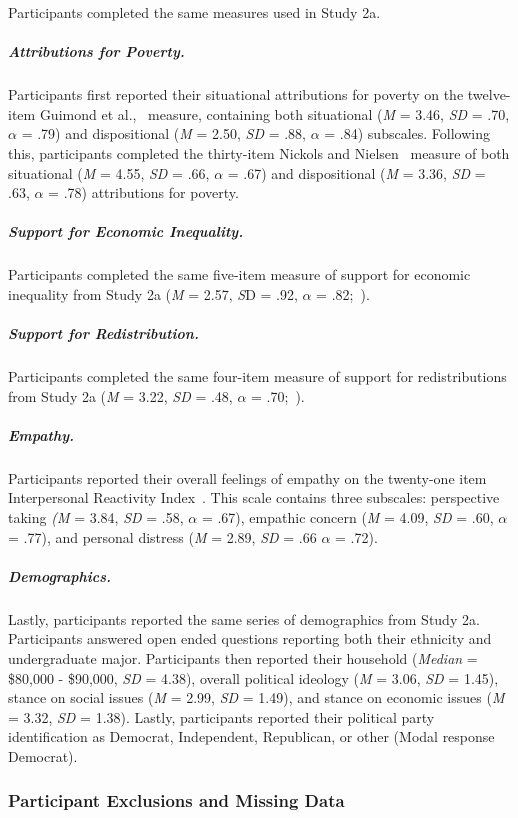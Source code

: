 \documentclass{sfuthesis}
\begin{document}
Participants completed the same measures used in Study 2a.

\subparagraph{Attributions for Poverty.} Participants first reported their situational attributions for poverty on the twelve-item Guimond et al.,~\cite{guimond89} measure, containing both situational (\textit{M} = 3.46, \textit{SD} = .70, $\alpha$ = .79) and dispositional (\textit{M} = 2.50, \textit{SD} = .88, $\alpha$ = .84) subscales. Following this, participants completed the thirty-item Nickols and Nielsen~\cite{nickols11} measure of both situational (\textit{M} = 4.55, \textit{SD} = .66, $\alpha$ = .67) and dispositional (\textit{M} = 3.36, \textit{SD} = .63, $\alpha$ = .78) attributions for poverty.

\subparagraph{Support for Economic Inequality.} Participants completed the same five-item measure of support for economic inequality from Study 2a (\textit{M} = 2.57, \textit{S}D = .92, $\alpha$ = .82;~\cite{wiwadunpub}).

\subparagraph{Support for Redistribution.} Participants completed the same four-item measure of support for redistributions from Study 2a (\textit{M} = 3.22, \textit{SD} = .48, $\alpha$ = .70;~\cite{inglehart}).

\subparagraph{Empathy.} Participants reported their overall feelings of empathy on the twenty-one item Interpersonal Reactivity Index~\cite{davis80}. This scale contains three subscales: perspective taking \textit{(M} = 3.84, \textit{SD} = .58, $\alpha$ = .67), empathic concern (\textit{M} = 4.09, \textit{SD} = .60, $\alpha$ = .77), and personal distress (\textit{M} = 2.89, \textit{SD} = .66 $\alpha$ = .72).

\subparagraph{Demographics.} Lastly, participants reported the same series of demographics from Study 2a. Participants answered open ended questions reporting both their ethnicity and undergraduate major. Participants then reported their household (\textit{Median} = \$80,000 - \$90,000, \textit{SD} = 4.38), overall political ideology (\textit{M} = 3.06, \textit{SD} = 1.45), stance on social issues (\textit{M} = 2.99, \textit{SD} = 1.49), and stance on economic issues (\textit{M} = 3.32, \textit{SD} = 1.38). Lastly, participants reported their political party identification as Democrat, Independent, Republican, or other (Modal response Democrat).

\subsubsection{Participant Exclusions and Missing Data}
\end{document}
